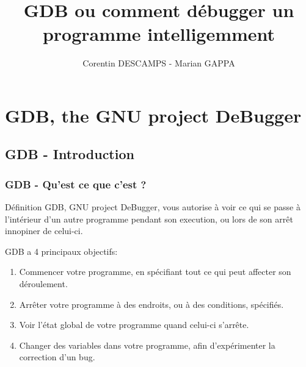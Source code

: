 \documentclass[8pt]{beamer}
\begin{document}
\title{GDB ou comment débugger un programme intelligemment}
\author{Corentin DESCAMPS - Marian GAPPA}

\maketitle

\begin{frame}
\tableofcontents
\end{frame}


\section{GDB, the GNU project DeBugger} %
\label{sec:gdb_the_gnu_project_debugger}

\subsection{GDB - Introduction} %
\label{sub:gdb_introduction}

\begin{frame}
\frametitle{GDB - Qu'est ce que c'est ?}

\begin{block}{Définition}
GDB, GNU project DeBugger, vous autorise à voir ce qui se passe à l'intérieur d'un autre programme pendant son execution, ou lors de son arrêt innopiner de celui-ci.
\end{block}

GDB a 4 principaux objectifs:
\begin{enumerate}
	\item Commencer votre programme, en spécifiant tout ce qui peut affecter son déroulement.
	\onslide<3->\item Arrêter votre programme à des endroits, ou à des conditions, spécifiés.
	\onslide<4->\item Voir l'état global de votre programme quand celui-ci s'arrête.
	\onslide<5->\item Changer des variables dans votre programme, afin d'expérimenter la correction d'un bug.
\end{enumerate}

\end{frame}
\end{document}
